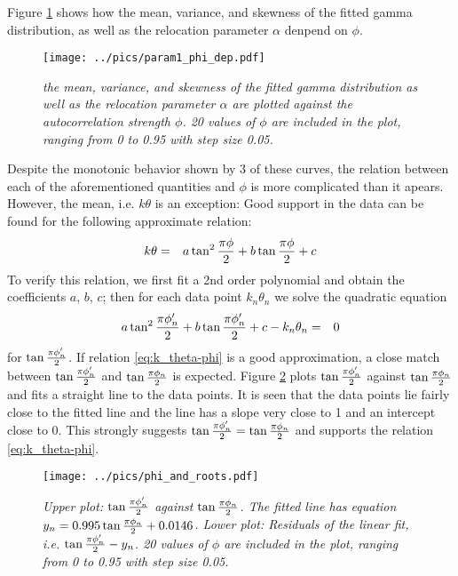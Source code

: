 Figure \ref{fig:param1_phi_dep} shows how the mean, variance,
and skewness of the fitted gamma distribution, as well as the
relocation parameter $\alpha$ denpend on $\phi$.
\begin{figure}[htb!]
  \centering
    \texttt{[image: ../pics/param1\_phi\_dep.pdf]}
  \caption{\small \it  the  mean, variance, and skewness of the fitted
    gamma distribution as well as the relocation parameter $\alpha$
    are plotted against the autocorrelation strength $\phi$. 20 values
    of $\phi$ are included in the plot, ranging from 0 to 0.95 with
    step size 0.05.}
  \label{fig:param1_phi_dep}
\end{figure}
Despite the monotonic behavior shown by 3 of these curves, the
relation between each of the aforementioned quantities and $\phi$ is
more complicated than it apears. However, the mean, i.e. $k \theta$ is
an exception: Good support in the data can be found for the following
approximate relation:
\begin{eqnarray}
  k\theta &=& a \tan^2{\pi \phi \over 2} + b\tan{\pi \phi \over 2} +
  c \label{eq:k_theta-phi}
\end{eqnarray}
To verify this relation, we first fit a 2nd order polynomial and
obtain the coefficients $a$, $b$, $c$; then for each data point
$k_n\theta_n$ we solve the quadratic equation
\begin{eqnarray}
  a \tan^2{\pi \phi'_n \over 2} + b\tan{\pi \phi'_n \over 2} + c -
  k_n\theta_n &=& 0\label{eq:k_theta-phi_2}
\end{eqnarray}
for $\tan{\pi \phi'_n \over 2}$. If relation \ref{eq:k_theta-phi} is a
good approximation, a close match between $\tan{\pi \phi'_n \over 2}$
and $\tan{\pi \phi_n \over 2}$ is expected. Figure
\ref{fig:phi_and_roots} plots $\tan{\pi \phi'_n \over 2}$ against
$\tan{\pi \phi_n \over 2}$ and fits a straight line to the data
points. It is seen that the data points lie fairly close to the fitted
line and the line has a slope very close to 1 and an intercept close to
0. This strongly suggests $\tan{\pi \phi'_n \over 2} = \tan{\pi \phi_n
  \over 2}$ and supports the relation \ref{eq:k_theta-phi}.
\begin{figure}[htb!]
  \centering
    \texttt{[image: ../pics/phi\_and\_roots.pdf]}
  \caption{\small \it Upper plot: $\tan{\pi \phi'_n \over 2}$ against
    $\tan{\pi \phi_n \over 2}$. The fitted line has equation $y_n =
    0.995 \tan{\pi \phi_n \over 2} + 0.0146$. Lower plot: Residuals of
    the linear fit, i.e. $\tan{\pi \phi'_n \over 2} - y_n$. 20 values
    of $\phi$ are included in the plot, ranging from 0 to 0.95 with
    step size 0.05.}
  \label{fig:phi_and_roots}
\end{figure}


